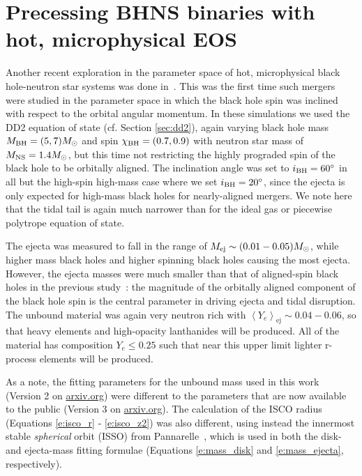 \section{Precessing BHNS binaries with hot, microphysical EOS}

Another recent exploration in the parameter space of hot, microphysical black hole-neutron star systems was done in~\cite{FoucartDD2:2017}.
This was the first time such mergers were studied in the parameter space in which the black hole spin was inclined with respect to the orbital angular momentum. 
In these simulations we used the DD2 equation of state (cf. Section \ref{sec:dd2}), again varying black hole mass $M_{\rm BH} = (5, 7) M_\odot$ and spin $\chi_{\rm BH} = (0.7, 0.9)$ with neutron star mass of $M_{\rm NS} = 1.4 M_\odot$, but this time not restricting the highly prograded spin of the black hole to be orbitally aligned.
The inclination angle was set to $i_{\rm BH}=60^{\circ}$ in all but the high-spin high-mass case where we set $i_{\rm BH}=20^{\circ}$, since the ejecta is only expected for high-mass black holes for nearly-aligned mergers.
We note here that the tidal tail is again much narrower than for the ideal gas or piecewise polytrope equation of state.  

The ejecta was measured to fall in the range of $M_{\rm ej} \sim (0.01 - 0.05) M_\odot$, while higher mass black holes and higher spinning black holes causing the most ejecta.  
However, the ejecta masses were much smaller than that of aligned-spin black holes in the previous study~\cite{Foucart:2014nda}: the magnitude of the orbitally aligned component of the black hole spin is the central parameter in driving ejecta and tidal disruption.  
The unbound material was again very neutron rich with $\left\langle Y_e \right\rangle_\textrm{ej} \sim 0.04 - 0.06$, so that heavy elements and high-opacity lanthanides will be produced.
All of the material has composition $Y_e \le 0.25$ such that near this upper limit lighter r-process elements will be produced.

As a note, the fitting parameters for the unbound mass used in this work (Version 2 on \url{arxiv.org}) were different to the parameters that are now available to the public (Version 3 on \url{arxiv.org}).
The calculation of the ISCO radius (Equations \ref{e:isco_r} - \ref{e:isco_z2}) was also different, using instead the innermost stable \textit{spherical} orbit (ISSO) from Pannarelle~\cite{Pannarale:2014}, which is used in both the disk- and ejecta-mass fitting formulae (Equations \ref{e:mass_disk} and \ref{e:mass_ejecta}, respectively).

